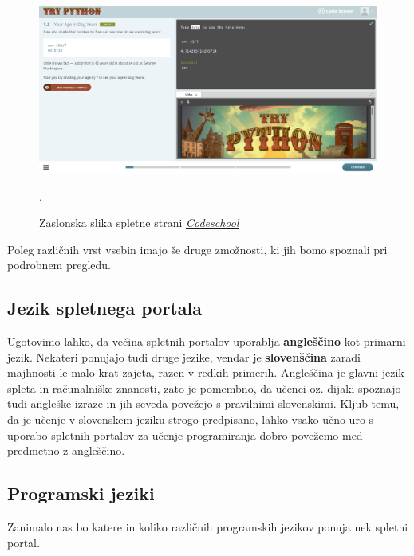 \begin{figure}[h!]
    \includegraphics [width=1\linewidth, keepaspectratio =
    1] {./images/sc_web/codeschool_01.png}
    \caption{Zaslonska slika spletne strani
      \emph{\href{https://www.codeschool.com/}{Codeschool}}
      \cite{web:codeschool}}.
    \label{fig:scr:web:codeschool}
\end{figure}

Poleg različnih vrst vsebin imajo še druge zmožnosti, ki jih bomo
spoznali pri podrobnem pregledu.

\subsection{Jezik spletnega portala}
\label{sec:jezik_spletnega_portala}

Ugotovimo lahko, da večina spletnih portalov uporablja
\textbf{angleščino} kot primarni jezik. Nekateri ponujajo tudi druge
jezike, vendar je \textbf{slovenščina} zaradi majhnosti le malo krat
zajeta, razen v redkih primerih. Angleščina je glavni jezik spleta in
računalniške znanosti, zato je pomembno, da učenci oz. dijaki spoznajo
tudi angleške izraze in jih seveda povežejo s pravilnimi
slovenskimi. Kljub temu, da je učenje v slovenskem jeziku strogo
predpisano, lahko vsako učno uro s uporabo spletnih portalov za učenje
programiranja dobro povežemo med predmetno z angleščino.


\subsection{Programski jeziki}
\label{sec:_zanaja_programski_jeziki}

Zanimalo nas bo katere in koliko različnih programskih jezikov ponuja
nek spletni portal.


